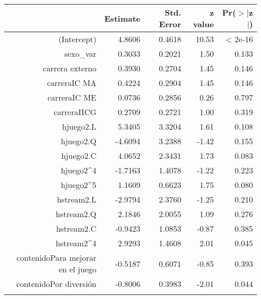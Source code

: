 \documentclass[11pt]{article}
\begin{document}
\begin{center}
\begin{table}[ht]
\centering
\begin{tabular}{rrrrr}
 \hline
& Estimate & Std. Error & z value & Pr($>$$|$z$|$) \\
 \hline
(Intercept)           &                                      4.8606   &   0.4618  &10.53  &< 2e-16\\
sexo\_var                                                    &0.3033      &0.2021   &1.50    &0.133\\
carrera externo                                            &0.3930      &0.2704   &1.45    &0.146\\
carreraIC MA                                            &0.4224      &0.2904   &1.45    &0.146\\
carreraIC ME                                             &0.0736      &0.2856   &0.26    &0.797\\
carreraIICG                                             &0.2709      &0.2721   &1.00    &0.319\\
hjuego2.L                                                  &5.3405      &3.3204   &1.61    &0.108\\
hjuego2.Q                                                 &-4.6094      &3.2388  &-1.42    &0.155\\
hjuego2.C                                                  &4.0652      &2.3431   &1.73    &0.083\\
hjuego2^4                                                 &-1.7163      &1.4078  &-1.22    &0.223\\
hjuego2^5                                                  &1.1609     &0.6623   &1.75    &0.080\\
hstream2.L                                                &-2.9794     &2.3760  &-1.25    &0.210\\
hstream2.Q                                                 &2.1846     &2.0055   &1.09    &0.276\\
hstream2.C                                                &-0.9423     &1.0853  &-0.87    &0.385\\
hstream2^4                                                 &2.9293     &1.4608   &2.01    &0.045\\
contenidoPara mejorar en el juego                          &-0.5187     &0.6071  &-0.85    &0.393\\
contenidoPor diversión                                    &-0.8006     &0.3983  &-2.01    &0.044\\
$$
\end{tabular}
\end{table}
\end{center}
\end{document}
